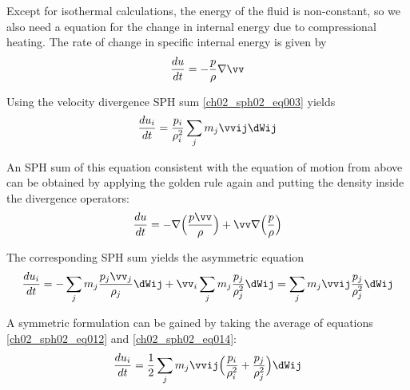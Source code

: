 Except for isothermal calculations, the energy of the fluid is non-constant, so we also need a equation for the change in internal energy due to compressional heating. The rate of change in specific internal energy is given by 
\begin{equation}
\label{ch02_sph02_eq011}
\frac{du}{dt} = -\frac{p}{\rho} \nabla \vv
\end{equation}

Using the velocity divergence SPH sum \ref{ch02_sph02_eq003}  yields
\begin{equation}
\label{ch02_sph02_eq012}
\frac{du_i}{dt} = \frac{p_i}{\rho_i^2} \sum_{j} m_j \vvij  \dWij
\end{equation}

An SPH sum of this equation consistent with the equation of motion from above can be obtained by applying the golden rule again and putting the density inside the divergence operators:
\begin{equation}
\label{ch02_sph02_eq013}
\frac{du}{dt} = - \nabla \Big( \frac{p \vv}{\rho} \Big) + \vv \nabla \Big( \frac{p}{\rho} \Big)
\end{equation}

The corresponding SPH sum yields the asymmetric equation
\begin{equation}
\label{ch02_sph02_eq014}
\frac{du_i}{dt} = - \sum_{j} m_{j} \frac{p_j \vv_j}{\rho_j} \dWij + \vv_i \sum_{j} m_{j} \frac{p_j}{\rho_j^2}  \dWij = \sum_{j} m_j \vvij \frac{p_j}{\rho_j^2}  \dWij
\end{equation}

A symmetric formulation can be gained by taking the average of equations \ref{ch02_sph02_eq012} and \ref{ch02_sph02_eq014}:
\begin{equation}
\label{ch02_sph02_eq015}
\frac{du_i}{dt} = \frac{1}{2} \sum_{j} m_{j} \vvij \Big( \frac{p_i}{\rho_i^2}  + \frac{p_j}{\rho_j^2} \Big) \dWij
\end{equation}

